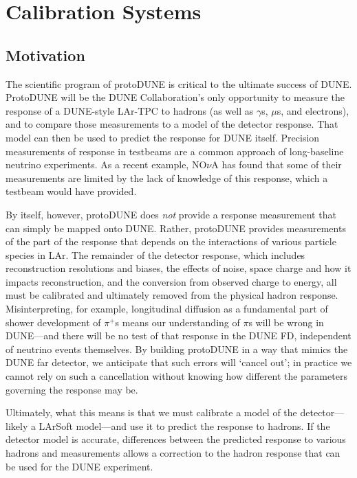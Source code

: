 
\section{Calibration Systems}
\subsection{Motivation}


	The scientific program of protoDUNE is critical to the ultimate success
of DUNE.  ProtoDUNE will be the DUNE Collaboration's only opportunity to
measure the response of a DUNE-style LAr-TPC to hadrons (as well as $\gamma$s,
$\mu$s, and electrons), and to compare those measurements to a model of the
detector response. That model can then be used to predict the response for DUNE
itself.  Precision measurements of response in testbeams are a common approach
of long-baseline neutrino experiments. As a recent example, NO{$\nu$}A has
found that some of their measurements are limited by the lack of knowledge of
this response, which a testbeam would have provided.
	
	By itself, however, protoDUNE does {\it not} provide a response
measurement that can simply be mapped onto DUNE.  Rather, protoDUNE provides
measurements of the part of the response that depends on the interactions of
various particle species in LAr.  The remainder of the detector response, which
includes reconstruction resolutions and biases, the effects of noise, space
charge and how it impacts reconstruction, and the conversion from observed
charge to energy, all must be calibrated and ultimately removed from the
physical hadron response.  Misinterpreting, for example, longitudinal diffusion
as a fundamental part of shower development of $\pi^+$s means our understanding
of $\pi$s will be wrong in DUNE---and there will be no test of that response in
the DUNE FD, independent of neutrino events themselves.  By building protoDUNE
in a way that mimics the DUNE far detector, we anticipate that such errors will
`cancel out'; in practice we cannot rely on such a cancellation without knowing
how different the parameters governing the response may be.

	Ultimately, what this means is that we must calibrate a model of the
detector---likely a LArSoft model---and use it to predict the response to
hadrons.  If the detector model is accurate, differences between the predicted
response to various hadrons and measurements allows a correction to the hadron
response that can be used for the DUNE experiment.  

